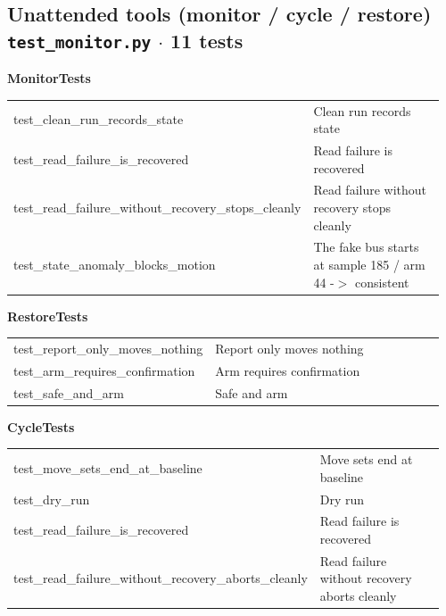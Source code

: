 \subsection{Unattended tools (monitor / cycle / restore) \hfill \normalfont\small\color{soft2}\texttt{test\_monitor.py} $\cdot$ 11 tests}
\par\smallskip \textbf{MonitorTests}\par\nopagebreak\smallskip
\begin{longtable}{@{}>{\ttfamily\scriptsize\raggedright\arraybackslash}p{0.40\linewidth} >{\footnotesize\raggedright\arraybackslash}p{0.555\linewidth}@{}}
test\_\allowbreak{}clean\_\allowbreak{}run\_\allowbreak{}records\_\allowbreak{}state & Clean run records state \\
test\_\allowbreak{}read\_\allowbreak{}failure\_\allowbreak{}is\_\allowbreak{}recovered & Read failure is recovered \\
test\_\allowbreak{}read\_\allowbreak{}failure\_\allowbreak{}without\_\allowbreak{}recovery\_\allowbreak{}stops\_\allowbreak{}cleanly & Read failure without recovery stops cleanly \\
test\_\allowbreak{}state\_\allowbreak{}anomaly\_\allowbreak{}blocks\_\allowbreak{}motion & The fake bus starts at sample 185 / arm 44 -$>$ consistent \\
\end{longtable}
\par\smallskip \textbf{RestoreTests}\par\nopagebreak\smallskip
\begin{longtable}{@{}>{\ttfamily\scriptsize\raggedright\arraybackslash}p{0.40\linewidth} >{\footnotesize\raggedright\arraybackslash}p{0.555\linewidth}@{}}
test\_\allowbreak{}report\_\allowbreak{}only\_\allowbreak{}moves\_\allowbreak{}nothing & Report only moves nothing \\
test\_\allowbreak{}arm\_\allowbreak{}requires\_\allowbreak{}confirmation & Arm requires confirmation \\
test\_\allowbreak{}safe\_\allowbreak{}and\_\allowbreak{}arm & Safe and arm \\
\end{longtable}
\par\smallskip \textbf{CycleTests}\par\nopagebreak\smallskip
\begin{longtable}{@{}>{\ttfamily\scriptsize\raggedright\arraybackslash}p{0.40\linewidth} >{\footnotesize\raggedright\arraybackslash}p{0.555\linewidth}@{}}
test\_\allowbreak{}move\_\allowbreak{}sets\_\allowbreak{}end\_\allowbreak{}at\_\allowbreak{}baseline & Move sets end at baseline \\
test\_\allowbreak{}dry\_\allowbreak{}run & Dry run \\
test\_\allowbreak{}read\_\allowbreak{}failure\_\allowbreak{}is\_\allowbreak{}recovered & Read failure is recovered \\
test\_\allowbreak{}read\_\allowbreak{}failure\_\allowbreak{}without\_\allowbreak{}recovery\_\allowbreak{}aborts\_\allowbreak{}cleanly & Read failure without recovery aborts cleanly \\
\end{longtable}
